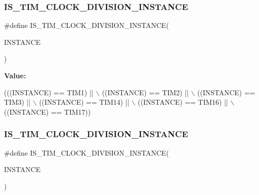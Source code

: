 \subsubsection{\texorpdfstring{I\+S\+\_\+\+T\+I\+M\+\_\+\+C\+L\+O\+C\+K\+\_\+\+D\+I\+V\+I\+S\+I\+O\+N\+\_\+\+I\+N\+S\+T\+A\+N\+CE}{IS\_TIM\_CLOCK\_DIVISION\_INSTANCE}\hspace{0.1cm}{\footnotesize\ttfamily [5/16]}}
{\footnotesize\ttfamily \#define I\+S\+\_\+\+T\+I\+M\+\_\+\+C\+L\+O\+C\+K\+\_\+\+D\+I\+V\+I\+S\+I\+O\+N\+\_\+\+I\+N\+S\+T\+A\+N\+CE(\begin{DoxyParamCaption}\item[{}]{I\+N\+S\+T\+A\+N\+CE }\end{DoxyParamCaption})}

{\bfseries Value\+:}
\begin{DoxyCode}
(((INSTANCE) == TIM1)    || \(\backslash\)
   ((INSTANCE) == TIM2)    || \(\backslash\)
   ((INSTANCE) == TIM3)    || \(\backslash\)
   ((INSTANCE) == TIM14)   || \(\backslash\)
   ((INSTANCE) == TIM16)   || \(\backslash\)
   ((INSTANCE) == TIM17))
\end{DoxyCode}
\mbox{\label{group___exported__macro_gac54b9f42e8ab07c41abe7d96d13d698a}} 
\subsubsection{\texorpdfstring{I\+S\+\_\+\+T\+I\+M\+\_\+\+C\+L\+O\+C\+K\+\_\+\+D\+I\+V\+I\+S\+I\+O\+N\+\_\+\+I\+N\+S\+T\+A\+N\+CE}{IS\_TIM\_CLOCK\_DIVISION\_INSTANCE}\hspace{0.1cm}{\footnotesize\ttfamily [6/16]}}
{\footnotesize\ttfamily \#define I\+S\+\_\+\+T\+I\+M\+\_\+\+C\+L\+O\+C\+K\+\_\+\+D\+I\+V\+I\+S\+I\+O\+N\+\_\+\+I\+N\+S\+T\+A\+N\+CE(\begin{DoxyParamCaption}\item[{}]{I\+N\+S\+T\+A\+N\+CE }\end{DoxyParamCaption})}

